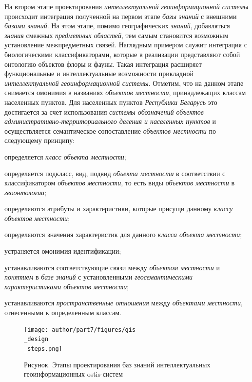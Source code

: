 На втором этапе проектирования \textit{интеллектуальной геоинформационной системы} происходит интеграция полученной на первом этапе \textit{базы знаний} с внешними \textit{базами знаний}. На этом этапе, помимо географических \textit{знаний}, добавляться \textit{знания} смежных \textit{предметных областей}, тем самым становится возможным установление межпредметных связей. Наглядным примером служит интеграция с биологическими классификаторами, которые в реализации представляют собой онтологию объектов флоры и фауны. Такая интеграция расширяет функциональные и интеллектуальные возможности прикладной \textit{интеллектуальной геоинформационной системы}. Отметим, что на данном этапе снимается омонимия в названиях \textit{объектов местности}, принадлежащих классам населенных пунктов. Для населенных пунктов \textit{Республики Беларусь} это достигается за счет использования \textit{системы обозначений объектов административно-территориального деления и населенных пунктов} и осуществляется семантическое сопоставление \textit{объектов местности} по следующему принципу:
\begin{textitemize}
	\item определяется \textit{класс объекта местности\scnsupergroupsign};
	\item определяется подкласс, вид, подвид \textit{объекта местности} в соответствии с классификатором \textit{объектов местности}, то есть виды \textit{объектов местности} в \textit{геоонтологии};
	\item определяются атрибуты и характеристики, которые присущи данному \textit{классу объектов местности\scnsupergroupsign};
	\item определяются значения характеристик для данного \textit{класса объекта местности\scnsupergroupsign};
	\item устраняется омонимия идентификации;
	\item устанавливаются соответствующие связи между \textit{объектом местности} и \textit{понятием} в \textit{базе знаний} с установленными \textit{геосемантическими характеристиками объектов местности};
	\item устанавливаются \textit{пространственные отношения} между \textit{объектами местности}, отнесенными к определенным классам.
\end{textitemize}

\begin{figure}[H]
	\caption{Рисунок. Этапы проектирования баз знаний интеллектуальных геоинформационных ostis-систем}
	\texttt{[image: author/part7/figures/gis\\\_design\\\_steps.png]}
	\label{fig:gis_design_steps}
\end{figure}


